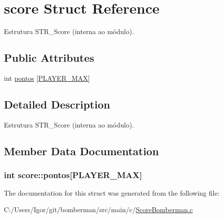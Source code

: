 \hypertarget{structscore}{\section{score Struct Reference}
\label{structscore}
}


Estrutura S\+T\+R\+\_\+\+Score (interna ao módulo).  


\subsection*{Public Attributes}
\begin{DoxyCompactItemize}
\item 
int \hyperlink{structscore_afa4d019f53de705caf9e4fd07f902b07}{pontos} \mbox{[}\hyperlink{_score_bomberman_8c_a8f899d075f01f6a01e44310d8e1f753a}{P\+L\+A\+Y\+E\+R\+\_\+\+M\+A\+X}\mbox{]}
\end{DoxyCompactItemize}


\subsection{Detailed Description}
Estrutura S\+T\+R\+\_\+\+Score (interna ao módulo). 



\subsection{Member Data Documentation}
\hypertarget{structscore_afa4d019f53de705caf9e4fd07f902b07}{
\subsubsection[{pontos}]{\setlength{\rightskip}{0pt plus 5cm}int score\+::pontos\mbox{[}{\bf P\+L\+A\+Y\+E\+R\+\_\+\+M\+A\+X}\mbox{]}}}\label{structscore_afa4d019f53de705caf9e4fd07f902b07}


The documentation for this struct was generated from the following file\+:\begin{DoxyCompactItemize}
\item 
C\+:/\+Users/\+Igor/git/bomberman/src/main/c/\hyperlink{_score_bomberman_8c}{Score\+Bomberman.\+c}\end{DoxyCompactItemize}
